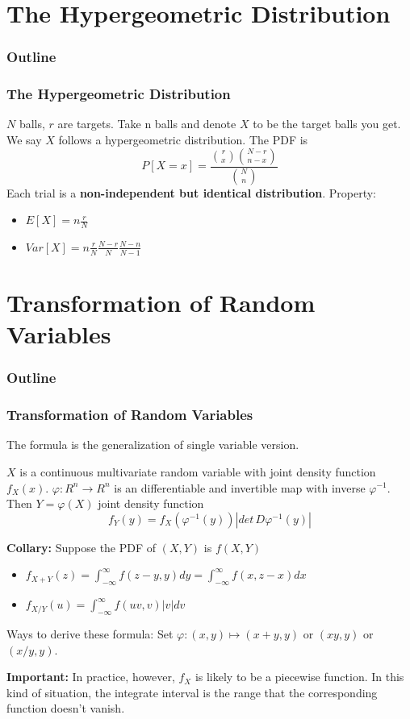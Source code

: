 \documentclass{beamer}
\begin{document}
\section{The Hypergeometric Distribution}

\begin{frame}
    \frametitle{Outline}
    \tableofcontents[currentsection]
\end{frame}

\begin{frame}
    \frametitle{The Hypergeometric Distribution}
    $N$ balls, $r$ are targets. Take n balls and denote $X$ to be the target balls you get. We say $X$ follows a hypergeometric distribution. The PDF is
    \[P[X=x]=\frac{\binom{r}{x}\binom{N-r}{n-x}}{\binom{N}{n}}\]
    Each trial is a \textbf{non-independent but identical distribution}.
    Property:
    \begin{itemize}
        \item $E[X]=n\frac{r}{N}$
        \item $Var[X]=n\frac{r}{N}\frac{N-r}{N}\frac{N-n}{N-1}$
    \end{itemize}
    

\end{frame}

\section{Transformation of Random Variables}

\begin{frame}
    \frametitle{Outline}
    \tableofcontents[currentsection]
\end{frame}
\begin{frame}
    \frametitle{Transformation of Random Variables}
    The formula is the generalization of single variable version.\par
    $X$ is a continuous multivariate random variable with joint density function $f_{X}(x)$. $\varphi: R^n\rightarrow R^n$ is an differentiable and invertible map with inverse $\varphi^{-1}$. Then $Y=\varphi(X)$ joint density function
    \[f_{Y}(y)=f_X(\varphi^{-1}(y))|det\, D\varphi^{-1}(y)|\]
    
    \textbf{Collary: } Suppose the PDF of $(X,Y)$ is $f(X,Y)$
    \begin{itemize}
        \item $f_{X+Y}(z)=\int_{-\infty}^{\infty}f(z-y,y)dy=\int_{-\infty}^{\infty}f(x,z-x)dx$
        \item $f_{X/Y}(u)=\int_{-\infty}^{\infty}f(uv,v)|v|dv$
    \end{itemize}
    Ways to derive these formula: Set $\varphi: (x,y)\mapsto (x+y,y)$ or $(xy,y)$ or $(x/y,y)$.\par
    \textbf{Important:} In practice, however, $f_{X}$ is likely to be a piecewise function. In this kind of situation, the integrate interval is the range that the corresponding function doesn't vanish.

\end{frame}
\end{document}
